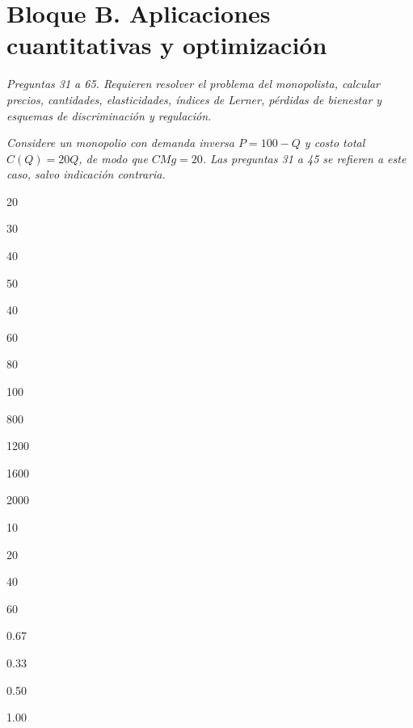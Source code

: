 \section*{Bloque B. Aplicaciones cuantitativas y optimización}

\noindent\textit{Preguntas 31 a 65. Requieren resolver el problema del monopolista, calcular precios, cantidades, elasticidades, índices de Lerner, pérdidas de bienestar y esquemas de discriminación y regulación.}

\noindent\textit{Considere un monopolio con demanda inversa $P=100-Q$ y costo total $C(Q)=20Q$, de modo que $CMg=20$. Las preguntas 31 a 45 se refieren a este caso, salvo indicación contraria.}

\begin{opts}
    \item 20
    \item 30
    \item 40
    \item 50
\end{opts}

\begin{opts}
    \item 40
    \item 60
    \item 80
    \item 100
\end{opts}

\begin{opts}
    \item 800
    \item 1200
    \item 1600
    \item 2000
\end{opts}

\begin{opts}
    \item 10
    \item 20
    \item 40
    \item 60
\end{opts}

\begin{opts}
    \item 0.67
    \item 0.33
    \item 0.50
    \item 1.00
\end{opts}

